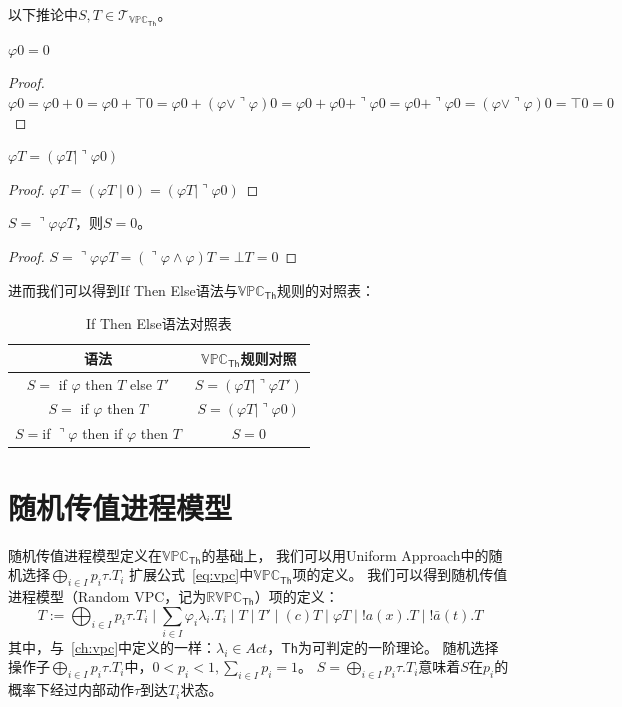 以下推论中$S,T\in \mathcal{T}_{\mathbb{VPC}_\mathsf{Th}}$。
\begin{corollary} 
   $\varphi 0 = 0$
\end{corollary}
\begin{proof}
   $\varphi 0 = \varphi 0 + 0 = \varphi 0 + \top 0 = \varphi 0 + (\varphi \vee \urcorner \varphi)0 = \varphi 0 + \varphi 0 + \urcorner \varphi 0 = \varphi 0 + \urcorner \varphi 0 = (\varphi \vee \urcorner \varphi)0 = \top 0 = 0$
\end{proof}
\begin{corollary}
   $\varphi T = (\varphi T\mid \urcorner \varphi 0)$
\end{corollary}
\begin{proof}
   $\varphi T = (\varphi T\mid 0) = (\varphi T\mid \urcorner \varphi 0)$
\end{proof}
\begin{corollary}
   $S=\urcorner\varphi \varphi T$，则$S=0$。
\end{corollary}
\begin{proof}
   $S=\urcorner\varphi \varphi T = (\urcorner\varphi\wedge\varphi)T=\bot T=0$
\end{proof}
进而我们可以得到If Then Else语法与$\mathbb{VPC}_\mathsf{Th}$规则的对照表：
\begin{table}[!hpt]
   \caption[If Then Else语法对照表]{If Then Else语法对照表\footnotemark}
   \label{tab:ifthenelse}
   \centering
   \begin{tabular}{@{}cc@{}} \toprule
     语法 & $\mathbb{VPC}_{\mathsf{Th}}$规则对照 \\ \midrule
     $S=$ if $\varphi$ then $T$ else $T'$& $S=(\varphi T|\urcorner \varphi T')$\\
     $S=$ if $\varphi$ then $T$ & $S=(\varphi T|\urcorner\varphi 0)$\\
     $S = $if $\urcorner \varphi$ then if $\varphi$ then $T$ & $S=0$\\ \bottomrule
   \end{tabular}
 \end{table}

\section{随机传值进程模型}
随机传值进程模型定义在$\mathbb{VPC}_{\mathsf{Th}}$的基础上，
我们可以用Uniform Approach中的随机选择$\bigoplus_{i\in I}p_i\tau.T_i$
扩展公式~\ref{eq:vpc}中$\mathbb{VPC}_{\mathsf{Th}}$项的定义。
我们可以得到随机传值进程模型（Random VPC，记为$\mathbb{RVPC}_{\mathsf{Th}}$）项的定义：
\begin{equation}\label{eq:rvpc}
   T:=\bigoplus_{i\in I}p_i \tau.T_i\mid \sum_{i\in I} \varphi_i\lambda_i.T_i\mid T \mid T'\mid (c)T\mid \varphi T\mid !a(x).T \mid !\bar{a}(t).T
\end{equation}
其中，与~\ref{ch:vpc}中定义的一样：$\lambda_i \in Act$，$\mathsf{Th}$为可判定的一阶理论。
随机选择操作子$\bigoplus_{i\in I}p_i\tau.T_i$中，$0<p_i<1, \sum_{i\in I}p_i = 1$。
$S=\bigoplus_{i\in I}p_i\tau.T_i$意味着$S$在$p_i$的概率下经过内部动作$\tau$到达$T_i$状态。

